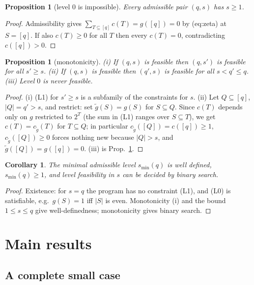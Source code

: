 \documentclass[11pt,a4paper]{article}
\theoremstyle{plain}
\newtheorem{proposition}[theorem]{Proposition}
\newtheorem{corollary}[theorem]{Corollary}
\theoremstyle{definition}
\begin{document}
\begin{proposition}[level $0$ is impossible]
\label{prop:level0}
Every admissible pair $(q,s)$ has $s\ge 1$.
\end{proposition}

\begin{proof}
Admissibility gives $\sum_{T\subseteq[q]}c(T)=g([q])=0$ by \textup{(eq:zeta)} at
$S=[q]$.  If also $c(T)\ge 0$ for all $T$ then every $c(T)=0$, contradicting
$c([q])>0$.
\end{proof}

\begin{proposition}[monotonicity]
\label{prop:monotone}
\textup{(i)} If $(q,s)$ is feasible then $(q,s')$ is feasible for all $s'\ge s$.
\textup{(ii)} If $(q,s)$ is feasible then $(q',s)$ is feasible for all $s<q'\le q$.
\textup{(iii)} Level $0$ is never feasible.
\end{proposition}

\begin{proof}
(i) (L1) for $s'\ge s$ is a subfamily of the constraints for $s$.
(ii) Let $Q\subseteq[q]$, $|Q|=q'>s$, and restrict: set $\tilde g(S)=g(S)$ for
$S\subseteq Q$.  Since $c(T)$ depends only on $g$ restricted to $2^T$ (the sum in (L1)
ranges over $S\subseteq T$), we get $c(T)=c_{\tilde g}(T)$ for $T\subseteq Q$; in
particular $c_{\tilde g}([Q])=c([q])\ge1$, $c_{\tilde g}([Q])\ge0$ forces nothing new
because $|Q|>s$, and $\tilde g([Q])=g([q])=0$.
(iii) is Prop.~\ref{prop:level0}.
\end{proof}

\begin{corollary}
The minimal admissible level $s_{\min}(q)$ is well defined, $s_{\min}(q)\ge 1$, and
level feasibility in $s$ can be decided by binary search.
\end{corollary}

\begin{proof}
Existence: for $s=q$ the program has no constraint (L1), and (L0) is satisfiable, e.g.\ 
$g(S)=1$ iff $|S|$ is even.  Monotonicity \textup{(i)} and the bound
$1\le s\le q$ give well-definedness; monotonicity gives binary search.
\end{proof}

\section{Main results}

\subsection{A complete small case}
\end{document}
